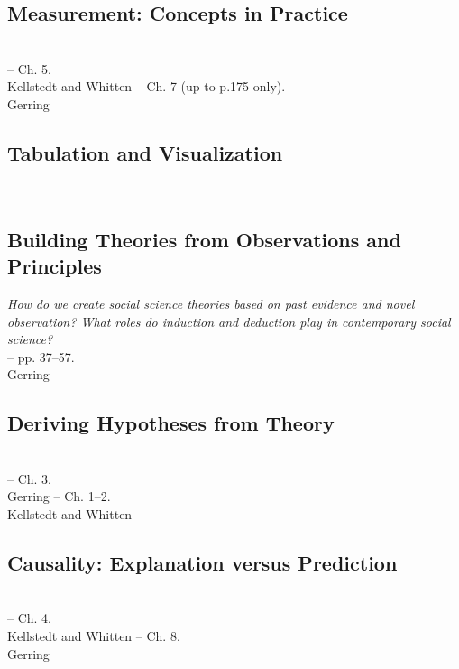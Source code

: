 \documentclass[12pt,a4paper]{article}
\newcommand{\lecture}[3][\DefaultOpt]{%
  \def\DefaultOpt{#2}%
  \clearpage\subsection[#1]{#2}\emph{#3}\vspace{.25em}\\
}
\newcommand{\reading}[2][]{\noindent -- {#1}\bibentry{#2}.\vspace{.25em}\\}
\newcommand{\textbook}[2][]{\noindent -- {#1}#2.\vspace{.25em}\\}
\begin{document}
\lecture{Measurement: Concepts in Practice}{}
\textbook{Ch. 5}{Kellstedt and Whitten}
\textbook{Ch. 7 (up to p.175 only)}{Gerring}

\lecture{Tabulation and Visualization}{}


\lecture{Building Theories from Observations and Principles}{How do we create social science theories based on past evidence and novel observation? What roles do induction and deduction play in contemporary social science?}
\textbook{pp. 37--57}{Gerring}

\lecture{Deriving Hypotheses from Theory}{} %
\textbook{Ch. 3}{Gerring}
\textbook{Ch. 1--2}{Kellstedt and Whitten}



\lecture{Causality: Explanation versus Prediction}{}
\textbook{Ch. 4}{Kellstedt and Whitten}
\textbook{Ch. 8}{Gerring}

\end{document}
